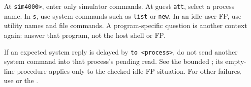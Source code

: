 At \passthrough{\lstinline!sim4000>!}, enter only simulator commands. At guest \passthrough{\lstinline!att!}, select a process name. In \passthrough{\lstinline!s!}, use system commands such as \passthrough{\lstinline!list!} or \passthrough{\lstinline!new!}. In an idle user FP, use utility names and file commands. A program-specific question is another context again: answer that program, not the host shell or FP.

If an expected system reply is delayed by \passthrough{\lstinline!to <process>!}, do not send another system command into that process's pending read. See the bounded ; its empty-line procedure applies only to the checked idle-FP situation. For other failures, use  or the .
